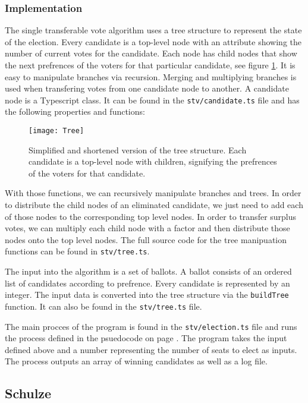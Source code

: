 \subsubsection{Implementation}
The single transferable vote algorithm uses a tree structure to represent the state of the election. Every candidate is a top-level node with an attribute showing the number of current votes for the candidate. Each node has child nodes that show the next prefrences of the voters for that particular candidate, see figure \ref{Tree structure}. It is easy to manipulate branches via recursion. Merging and multiplying branches is used when transfering votes from one candidate node to another. A candidate node is a Typescript class. It can be found in the \texttt{stv/candidate.ts} file and has the following properties and functions:

\begin{figure}[H]
	\centering
	\texttt{[image: Tree]}
	\caption{Simplified and shortened version of the tree structure. Each candidate is a top-level node with children, signifying the prefrences of the voters for that candidate.}
	\label{Tree structure}
\end{figure}
With those functions, we can recursively manipulate branches and trees. In order to distribute the child nodes of an eliminated candidate, we just need to add each of those nodes to the corresponding top level nodes. In order to transfer surplus votes, we can multiply each child node with a factor and then distribute those nodes onto the top level nodes. The full source code for the tree manipuation functions can be found in \texttt{stv/tree.ts}.

The input into the algorithm is a set of ballots. A ballot consists of an ordered list of candidates according to prefrence. Every candidate is represented by an integer. The input data is converted into the tree structure via the \texttt{buildTree} function. It can also be found in the \texttt{stv/tree.ts} file.

The main procces of the program is found in the \texttt{stv/election.ts} file and runs the process defined in the psuedocode on page \pageref{Stv psuedocode}. The program takes the input defined above and a number representing the number of seats to elect as inputs. The process outputs an array of winning candidates as well as a log file.

\subsection{Schulze}
